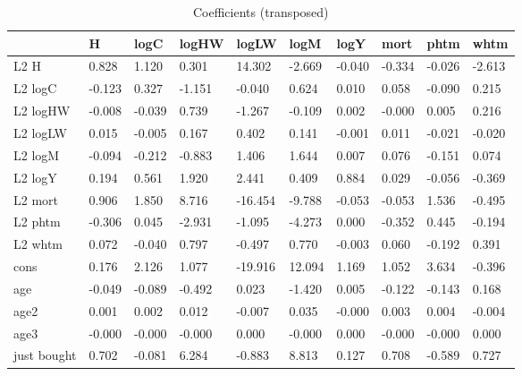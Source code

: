 \begin{table}[htbp]
\caption{\label{clabel} Coefficients (transposed)}\centering\medskip
\begin{tabular}{llllllllll} \hline \hline
 & H  & logC  & logHW  & logLW  & logM  & logY  & mort  & phtm  & whtm  \\  \hline 
L2 H &     0.828 &     1.120 &     0.301 &    14.302 &    -2.669 &    -0.040 &    -0.334 &    -0.026 &    -2.613 \\  
L2 logC &    -0.123 &     0.327 &    -1.151 &    -0.040 &     0.624 &     0.010 &     0.058 &    -0.090 &     0.215 \\  
L2 logHW &    -0.008 &    -0.039 &     0.739 &    -1.267 &    -0.109 &     0.002 &    -0.000 &     0.005 &     0.216 \\  
L2 logLW &     0.015 &    -0.005 &     0.167 &     0.402 &     0.141 &    -0.001 &     0.011 &    -0.021 &    -0.020 \\  
L2 logM &    -0.094 &    -0.212 &    -0.883 &     1.406 &     1.644 &     0.007 &     0.076 &    -0.151 &     0.074 \\  
L2 logY &     0.194 &     0.561 &     1.920 &     2.441 &     0.409 &     0.884 &     0.029 &    -0.056 &    -0.369 \\  
L2 mort &     0.906 &     1.850 &     8.716 &   -16.454 &    -9.788 &    -0.053 &    -0.053 &     1.536 &    -0.495 \\  
L2 phtm &    -0.306 &     0.045 &    -2.931 &    -1.095 &    -4.273 &     0.000 &    -0.352 &     0.445 &    -0.194 \\  
L2 whtm &     0.072 &    -0.040 &     0.797 &    -0.497 &     0.770 &    -0.003 &     0.060 &    -0.192 &     0.391 \\  
cons &     0.176 &     2.126 &     1.077 &   -19.916 &    12.094 &     1.169 &     1.052 &     3.634 &    -0.396 \\  
age &    -0.049 &    -0.089 &    -0.492 &     0.023 &    -1.420 &     0.005 &    -0.122 &    -0.143 &     0.168 \\  
age2 &     0.001 &     0.002 &     0.012 &    -0.007 &     0.035 &    -0.000 &     0.003 &     0.004 &    -0.004 \\  
age3 &    -0.000 &    -0.000 &    -0.000 &     0.000 &    -0.000 &     0.000 &    -0.000 &    -0.000 &     0.000 \\  
just bought &     0.702 &    -0.081 &     6.284 &    -0.883 &     8.813 &     0.127 &     0.708 &    -0.589 &     0.727 \\  
\hline \hline \end{tabular}
\end{table}
